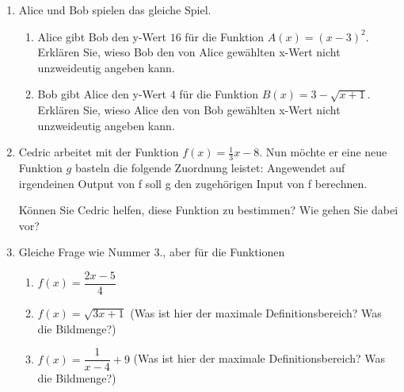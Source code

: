 \begin{enumerate}
\begin{multicols}{2}
\begin{enumerate}
              \end{enumerate}
          \end{multicols}
    \item Alice und Bob spielen das gleiche Spiel.
          \begin{enumerate}
              \item Alice gibt Bob den y-Wert $16$ für die Funktion $A(x)=(x-3)^2$. Erklären Sie, wieso Bob den von Alice gewählten x-Wert nicht unzweideutig angeben kann.
              \item Bob gibt Alice den y-Wert $4$ für die Funktion $B(x)=3-\sqrt{x+1}$. Erklären Sie, wieso Alice den von Bob gewählten x-Wert nicht unzweideutig angeben kann.
          \end{enumerate}
    \item 	Cedric arbeitet mit der Funktion $f(x)=\frac{1}{3} x-8$. Nun möchte er eine neue Funktion $g$ basteln die folgende Zuordnung leistet: Angewendet auf irgendeinen Output von f soll g den zugehörigen Input von f berechnen.

          Können Sie Cedric helfen, diese Funktion zu bestimmen? Wie gehen Sie dabei vor?
    \item Gleiche Frage wie Nummer 3., aber für die Funktionen
          \begin{enumerate}
              \item $f(x) = \dfrac{2x - 5}{4}$
              \item $f(x) = \sqrt{3x + 1}$ \quad (Was ist hier der maximale Definitionsbereich? Was die Bildmenge?)
              \item $f(x) = \dfrac{1}{x - 4} + 9$ \quad (Was ist hier der maximale Definitionsbereich? Was die Bildmenge?)
          \end{enumerate}
\end{enumerate}
\newpage
